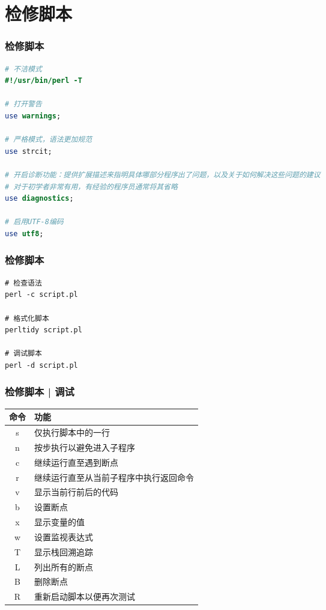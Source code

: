 \section{检修脚本}
\begin{frame}[fragile]
  \frametitle{\alert{检修脚本}}
\begin{lstlisting}[language=Perl,basicstyle=\small\tt]
# 不洁模式
#!/usr/bin/perl -T

# 打开警告
use warnings;

# 严格模式，语法更加规范
use strcit;

# 开启诊断功能：提供扩展描述来指明具体哪部分程序出了问题，以及关于如何解决这些问题的建议
# 对于初学者非常有用，有经验的程序员通常将其省略
use diagnostics;

# 启用UTF-8编码
use utf8;
\end{lstlisting}
\end{frame}

\begin{frame}[fragile]
  \frametitle{\alert{检修脚本}}
\begin{lstlisting}
# 检查语法
perl -c script.pl

# 格式化脚本
perltidy script.pl

# 调试脚本
perl -d script.pl
\end{lstlisting}
\end{frame}

\begin{frame}
  \frametitle{检修脚本 | 调试}
  \begin{table}
    \centering
    \begin{tabularx}{0.8\textwidth}{cX}
      \hline
      \rowcolor{blue!50}命令 & 功能\\
      \hline
      s & 仅执行脚本中的一行\\
      n & 按步执行以避免进入子程序\\
      c & 继续运行直至遇到断点\\
      r & 继续运行直至从当前子程序中执行返回命令\\
      v & 显示当前行前后的代码\\
      b & 设置断点\\
      x & 显示变量的值\\
      w & 设置监视表达式\\
      T & 显示栈回溯追踪\\
      L & 列出所有的断点\\
      B & 删除断点\\
      R & 重新启动脚本以便再次测试\\
      \hline
    \end{tabularx}
  \end{table}
\end{frame}

